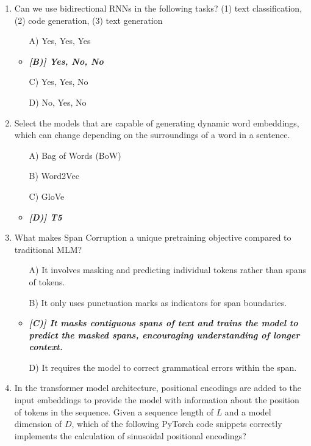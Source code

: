 \documentclass[10pt]{article}
\begin{document}
\begin{enumerate}
    \item Can we use bidirectional RNNs in the following tasks? (1) text classification, (2) code generation, (3) text generation
    \begin{itemize}
        \item[A)] Yes, Yes, Yes 
        \item\textit{\textbf{[B)] Yes, No, No} }
        \item[C)] Yes, Yes, No 
        \item[D)] No, Yes, No
    \end{itemize}


    \item Select the models that are capable of generating dynamic word embeddings, which can change depending on the surroundings of a word in a sentence.
    \begin{itemize}
        \item[A)] Bag of Words (BoW)
        \item[B)] Word2Vec 
        \item[C)] GloVe
        \item\textbf{\textit{[D)] T5}}
    \end{itemize}


    \item What makes Span Corruption a unique pretraining objective compared to traditional MLM?
    \begin{itemize}
        \item[A)] It involves masking and predicting individual tokens rather than spans of tokens.
        \item[B)] It only uses punctuation marks as indicators for span boundaries.
        \item\textbf{\textit{[C)] It masks contiguous spans of text and trains the model to predict the masked spans, encouraging understanding of longer context.}}
        \item[D)] It requires the model to correct grammatical errors within the span.
    \end{itemize}

    \item In the transformer model architecture, positional encodings are added to the input embeddings to provide the model with information about the position of tokens in the sequence. Given a sequence length of \(L\) and a model dimension of \(D\), which of the following PyTorch code snippets correctly implements the calculation of sinusoidal positional encodings?


\end{enumerate}
\end{document}
